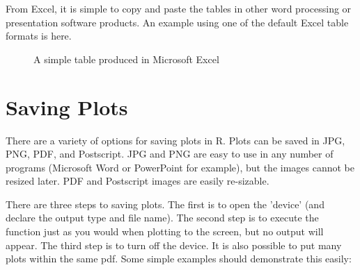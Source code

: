 \documentclass[a4paper,11pt]{article}\usepackage[]{graphicx}\usepackage[]{color}
\begin{document}
From Excel, it is simple to copy and paste the tables in other word processing or presentation software products. An example using one of the default Excel table formats is here.

\begin{figure}[ht!]
\centering
\caption{A simple table produced in Microsoft Excel}
\label{overflow}
\end{figure}

\FloatBarrier

\section{Saving Plots}
\label{app:savingPlots}
There are a variety of options for saving plots in R. Plots can be saved in JPG, PNG, PDF, and Postscript. JPG and PNG are easy to use in any number of programs (Microsoft Word or PowerPoint for example), but the images cannot be resized later. PDF and Postscript images are easily re-sizable.

There are three steps to saving plots. The first is to open the 'device' (and declare the output type and file name). The second step is to execute the function just as you would when plotting to the screen, but no output will appear. The third step is to turn off the device. It is also possible to put many plots within the same pdf.  Some simple examples should demonstrate this easily:
\end{document}
